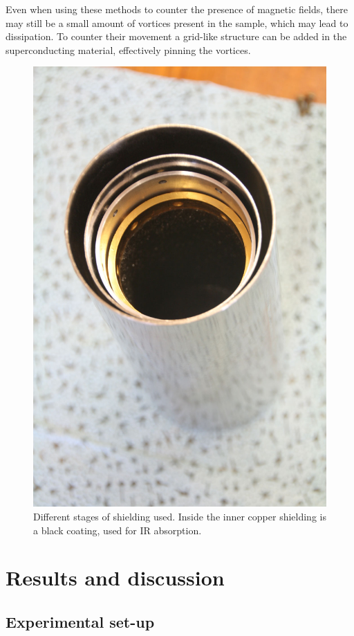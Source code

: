   Even when using these methods to counter the presence of magnetic fields, there may still be a small amount of vortices present in the sample, which may lead to dissipation. To counter their movement a grid-like structure can be added in the superconducting material, effectively pinning the vortices.

  \begin{figure}[h]
    \centering
      \includegraphics[width=.4\textwidth]{Figures/DRIE/Shielding.jpg}
    \caption{Different stages of shielding used. Inside the inner copper shielding is a black coating, used for IR absorption.}
    \label{fig:shielding}
  \end{figure}

\chapter{Results and discussion}
\label{ch:Results and discussion}

  \section{Experimental set-up}
    \label{sec:Experimental set-up}


